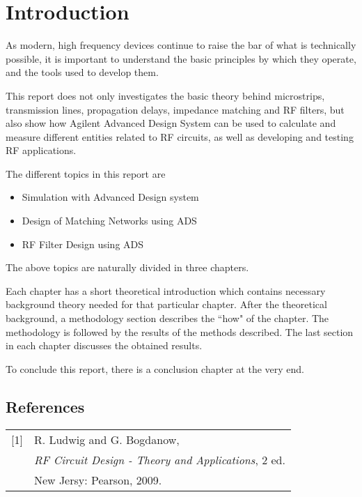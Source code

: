 \documentclass[report.tex]{subfiles}
\begin{document}
\pagebreak \section{Introduction}
As modern, high frequency devices continue to raise the bar of what is technically possible, it is important to understand the basic principles by which they operate, and the tools used to develop them. 

This report does not only investigates the basic theory behind microstrips, transmission lines, propagation delays, impedance matching and RF filters, but also show how Agilent Advanced Design System can be used to calculate and measure different entities related to RF circuits, as well as developing and testing RF applications.

The different topics in this report are
\begin{itemize}
\item Simulation with Advanced Design system
\item Design of Matching Networks using ADS
\item RF Filter Design using ADS
\end{itemize}
The above topics are naturally divided in three chapters.

Each chapter has a short theoretical introduction which contains necessary background theory needed for that particular chapter.
After the theoretical background, a methodology section describes the ``how" of the chapter.
The methodology is followed by the results of the methods described.
The last section in each chapter discusses the obtained results.

To conclude this report, there is a conclusion chapter at the very end.

\subsection{References}
\begin{table}[H]
	\begin{tabular}{l l}
		[1] & R. Ludwig and G. Bogdanow, \\
		& \textit{RF Circuit Design - Theory and Applications}, 2 ed. \\
		& New Jersy: Pearson, 2009.
	\end{tabular}
\end{table}
\end{document}
